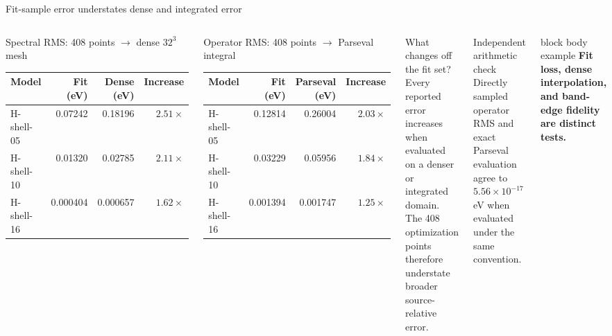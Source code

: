 \documentclass[aspectratio=169,10pt]{beamer}
\begin{document}
\begin{frame}{Fit-sample error understates dense and integrated error}
  \begin{columns}[T,onlytextwidth]
      \begin{block}{Spectral RMS: 408 points $\rightarrow$ dense $32^3$ mesh}
        \centering\small
        \begin{tabular}{@{}lrrr@{}}
          \toprule
          Model & Fit (eV) & Dense (eV) & Increase\\
          \midrule
          H-shell-05 & 0.07242 & 0.18196 & $2.51\times$\\
          H-shell-10 & 0.01320 & 0.02785 & $2.11\times$\\
          H-shell-16 & 0.000404 & 0.000657 & $1.62\times$\\
          \bottomrule
        \end{tabular}
      \end{block}
      \begin{exampleblock}{Operator RMS: 408 points $\rightarrow$ Parseval integral}
        \centering\small
        \begin{tabular}{@{}lrrr@{}}
          \toprule
          Model & Fit (eV) & Parseval (eV) & Increase\\
          \midrule
          H-shell-05 & 0.12814 & 0.26004 & $2.03\times$\\
          H-shell-10 & 0.03229 & 0.05956 & $1.84\times$\\
          H-shell-16 & 0.001394 & 0.001747 & $1.25\times$\\
          \bottomrule
        \end{tabular}
      \end{exampleblock}

      \begin{block}{What changes off the fit set?}
        \scriptsize
        Every reported error increases when evaluated on a denser or integrated domain.
        The 408 optimization points therefore understate broader source-relative error.
      \end{block}
      \begin{exampleblock}{Independent arithmetic check}
        \scriptsize
        Directly sampled operator RMS and exact Parseval evaluation agree to
        $5.56\times10^{-17}$ eV when evaluated under the same convention.
      \end{exampleblock}
      \begin{beamercolorbox}[rounded=true,sep=0.48em,wd=\textwidth]{block body example}
        \centering\small\bfseries\color{resultblue}
        Fit loss, dense interpolation, and band-edge fidelity are distinct tests.
      \end{beamercolorbox}
  \end{columns}
\end{frame}
\end{document}
